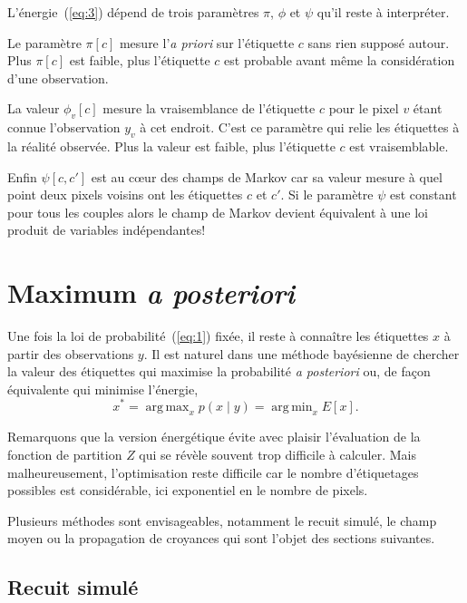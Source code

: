 \documentclass[a4paper,11pt,oneside]{article}
\DeclareMathOperator*{\argmax}{arg\,max}
\DeclareMathOperator*{\argmin}{arg\,min}
\begin{document}
L'énergie~(\ref{eq:3}) dépend de trois paramètres $\pi$,
$\phi$ et $\psi$ qu'il reste à interpréter.

Le paramètre $\pi[c]$ mesure l'\emph{a priori} sur
l'étiquette $c$ sans rien supposé autour. Plus $\pi[c]$ est
faible, plus l'étiquette $c$ est probable avant même la
considération d'une observation.

La valeur $\phi_v[c]$ mesure la vraisemblance de l'étiquette
$c$ pour le pixel $v$ étant connue l'observation $y_v$ à cet
endroit. C'est ce paramètre qui relie les étiquettes à la
réalité observée. Plus la valeur est faible, plus
l'étiquette $c$ est vraisemblable.

Enfin $\psi[c, c']$ est au cœur des champs de Markov car sa
valeur mesure à quel point deux pixels voisins ont les
étiquettes $c$ et $c'$. Si le paramètre $\psi$ est constant
pour tous les couples alors le champ de Markov devient
équivalent à une loi produit de variables indépendantes!




\section{Maximum \emph{a posteriori}}
\label{sec:maximum-posteriori}

Une fois la loi de probabilité~(\ref{eq:1}) fixée, il reste
à connaître les étiquettes $x$ à partir des observations
$y$. Il est naturel dans une méthode bayésienne de chercher
la valeur des étiquettes qui maximise la probabilité \emph{a
  posteriori} ou, de façon équivalente qui minimise
l'énergie,
\begin{equation}
  \label{eq:5}
  x^* = \argmax_x p(x\mid y) = \argmin_x E[x].
\end{equation}

Remarquons que la version énergétique évite avec plaisir
l'évaluation de la fonction de partition $Z$ qui se révèle
souvent trop difficile à calculer. Mais malheureusement,
l'optimisation reste difficile car le nombre d'étiquetages
possibles est considérable, ici exponentiel en le nombre de
pixels.

Plusieurs méthodes sont envisageables, notamment le recuit
simulé, le champ moyen ou la propagation de croyances qui
sont l'objet des sections suivantes.



\subsection{Recuit simulé}
\label{sec:recuit-simule}
\end{document}
